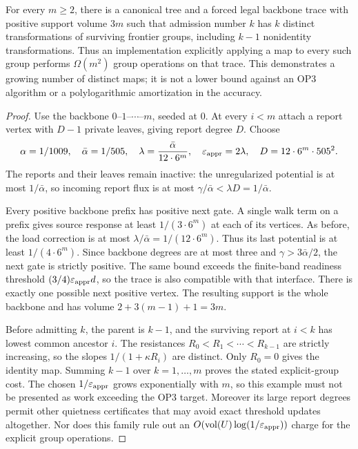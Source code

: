 \begin{proposition}
\label{prop:op3-tree-many-threshold-groups}
For every $m\geq2$, there is a canonical tree and a forced legal backbone
trace with positive support volume $3m$ such that admission number $k$
has $k$ distinct transformations of surviving frontier groups, including
$k-1$ nonidentity transformations. Thus an implementation explicitly
applying a map to every such group performs $\Omega(m^2)$ group operations
on that trace. This demonstrates a growing number of distinct maps; it is
not a lower bound against an OP3 algorithm or a polylogarithmic
amortization in the accuracy.
\end{proposition}
\begin{proof}
Use the backbone $0$--$1$--$\cdots$--$m$, seeded at $0$. At every
$i<m$ attach a report vertex with $D-1$ private leaves, giving report
degree $D$. Choose
\[
 \alpha=1/1009,\quad \bar\alpha=1/505,\quad
 \lambda=\frac{\bar\alpha}{12\cdot6^m},\quad
 \varepsilon_{\mathrm{appr}}=2\lambda,\quad D=12\cdot6^m\cdot505^2.
\]
The reports and their leaves remain inactive: the unregularized potential
is at most $1/\bar\alpha$, so incoming report flux is at most
$\gamma/\bar\alpha<\lambda D=1/\bar\alpha$.

Every positive backbone prefix has positive next gate. A single walk term
on a prefix gives source response at least $1/(3\cdot6^m)$ at each of its
vertices. As before, the load correction is at most
$\lambda/\bar\alpha=1/(12\cdot6^m)$. Thus its last potential is at least
$1/(4\cdot6^m)$. Since backbone degrees are at most three and
$\gamma>3\bar\alpha/2$, the next gate is strictly positive. The same bound
exceeds the finite-band readiness threshold
$(3/4)\varepsilon_{\mathrm{appr}} d$, so the trace is also compatible with that interface.
There is exactly one possible next positive vertex. The resulting support
is the whole backbone and has volume $2+3(m-1)+1=3m$.

Before admitting $k$, the parent is $k-1$, and the surviving report at
$i<k$ has lowest common ancestor $i$. The resistances
$R_0<R_1<\cdots<R_{k-1}$ are strictly increasing, so the slopes
$1/(1+\kappa R_i)$ are distinct. Only $R_0=0$ gives the identity map.
Summing $k-1$ over $k=1,\ldots,m$ proves the stated explicit-group cost.
The chosen $1/\varepsilon_{\mathrm{appr}}$ grows exponentially with $m$, so this example
must not be presented as work exceeding the OP3 target. Moreover its large
report degrees permit other quietness certificates that may avoid exact
threshold updates altogether. Nor does this family rule out an
$O(\operatorname{vol}(U)\log(1/\varepsilon_{\mathrm{appr}}))$ charge for the explicit group operations.
\end{proof}

